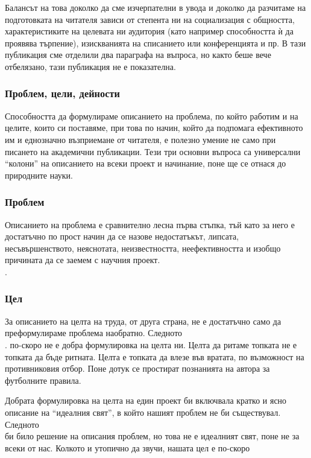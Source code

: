 \documentclass[11pt, oneside]{article}     %
\begin{document}
  Балансът на това доколко да сме изчерпателни в увода и доколко да разчитаме на подготовката на читателя зависи от степента ни на социализация с общността, характеристиките на целевата ни аудитория (като например способността ѝ да проявява търпение), изискванията на списанието или конференцията и пр. В тази публикация сме отделили два параграфа на въпроса, но както беше вече отбелязано, тази публикация не е показателна.

  \subsubsection*{Проблем, цели, дейности}

  Способността да формулираме описанието на проблема, по който работим и на целите, които си поставяме, при това по начин, който да подпомага ефективното им и еднозначно възприемане от читателя, е полезно умение не само при писането на академични публикации. Тези три основни въпроса са универсални ``колони'' на описанието на всеки проект и начинание, поне ще се отнася до природните науки.
  \subsubsection*{Проблем}
  Описанието на проблема е сравнително лесна първа стъпка, тъй като за него е достатъчно по прост начин да се назове недостатъкът, липсата, несъвършенството, неяснотата, неизвестността, неефективността и изобщо причината да се заемем с научния проект.\\
  .
  \subsubsection*{Цел}
  За описанието на целта на труда, от друга страна, не е достатъчно само да преформулираме проблема наобратно. Следното \\
  .
  по-скоро не е добра формулировка на целта ни. Целта да ритаме топката не е топката да бъде ритната. Целта е топката да влезе във вратата, по възможност на противниковия отбор.   Поне дотук се простират познанията на автора за футболните правила.

  Добрата формулировка на целта на един проект би включвала кратко и ясно описание на ``идеалния свят'', в който нашият проблем не би съществувал. Следното\\
   би било решение на описания проблем, но това не е идеалният свят, поне не за всеки от нас. Колкото и утопично да звучи, нашата цел е по-скоро \\
\end{document}

